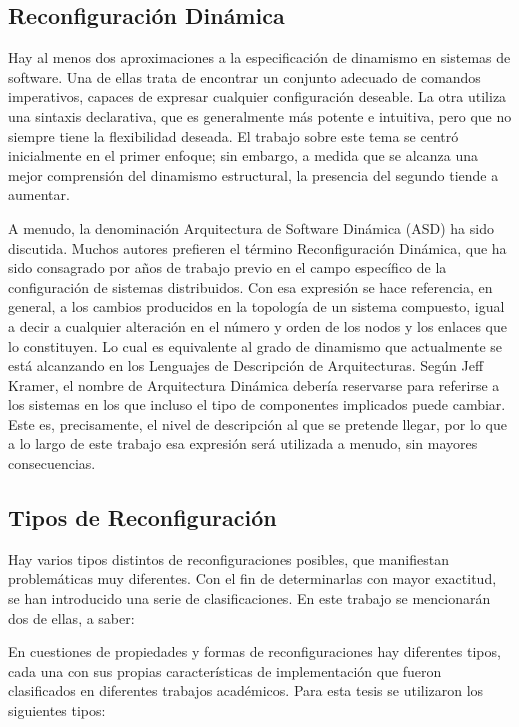 \subsection{Reconfiguración Dinámica}

Hay al menos dos aproximaciones a la especificación de dinamismo en sistemas de
software. Una de ellas trata de encontrar un conjunto adecuado de comandos
imperativos, capaces de expresar cualquier configuración deseable. La otra
utiliza una sintaxis declarativa, que es generalmente más potente e intuitiva,
pero que no siempre tiene la flexibilidad deseada. El trabajo sobre este tema
se centró inicialmente en el primer enfoque; sin embargo, a medida que se
alcanza una mejor comprensión del dinamismo estructural, la presencia del
segundo tiende a aumentar.

A menudo, la denominación Arquitectura de Software Dinámica (ASD) ha sido
discutida. Muchos autores prefieren el término Reconfiguración Dinámica, que
ha sido consagrado por años de trabajo previo en el campo específico de la
configuración de sistemas distribuidos. Con esa expresión se hace referencia,
en general, a los cambios producidos en la topología de un sistema compuesto, igual a decir a cualquier alteración en el número y orden de los nodos y
los enlaces que lo constituyen. Lo cual es equivalente al grado de dinamismo que actualmente se
está alcanzando en los Lenguajes de Descripción de Arquitecturas. Según Jeff
Kramer, el nombre de Arquitectura Dinámica debería reservarse para referirse a
los sistemas en los que incluso el tipo de componentes implicados puede cambiar.
Este es, precisamente, el nivel de descripción al que se pretende llegar, por
lo que a lo largo de este trabajo esa expresión será utilizada a menudo, sin
mayores consecuencias.


\subsection{Tipos de Reconfiguración}

Hay varios tipos distintos de reconfiguraciones posibles, que manifiestan
problemáticas muy diferentes. Con el fin de determinarlas con mayor exactitud,
se han introducido una serie de clasificaciones. En este trabajo se mencionarán
dos de ellas, a saber:

En cuestiones de propiedades y formas de reconfiguraciones hay diferentes tipos, cada una con sus propias características de implementación que fueron clasificados en diferentes trabajos académicos. Para esta tesis se utilizaron los siguientes tipos: 

